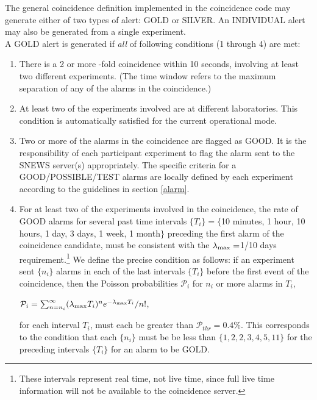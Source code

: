 \documentclass{article}
\begin{document}
The general coincidence definition implemented in the coincidence code
may generate either of two types of alert: GOLD or SILVER.
An INDIVIDUAL alert may also be generated from a single experiment.\\
A GOLD alert is generated if {\it all} of
following conditions (1 through 4) are met:

\begin{enumerate}

\item There is a 2 or more -fold coincidence within 10 seconds,
involving at least two different experiments. 
(The time window refers to the maximum
separation of any of the alarms in the coincidence.)

\item At least two of the experiments involved
are at different laboratories.  This condition is automatically
satisfied for the current operational mode.

\item Two or more of the alarms in the coincidence
are flagged as GOOD.  It is the responsibility of each participant
experiment to flag the alarm sent to the SNEWS server(s)
appropriately. The specific criteria for a GOOD/POSSIBLE/TEST alarms
are locally defined by each experiment according to the guidelines 
in section \ref{alarm}.
  
 \item For at least two of the experiments involved in the
 coincidence, the rate of GOOD alarms for several past time intervals
 $\{T_i\}=\{$10 minutes, 1 hour, 10 hours, 1 day, 3 days, 1 week, 1
 month$\}$ preceding the first alarm of the coincidence candidate, 
 must be consistent with the $\lambda_{\rm{max}}=$1/10 days
 requirement.\footnote{These intervals represent real time, not live
 time, since full live time information will not be available to the
 coincidence server.}  We define the precise condition as follows: if
 an experiment sent $\{n_i\}$ alarms in each of the last intervals
 $\{T_i\}$ before the first event of the coincidence, then the Poisson probabilities $\mathcal{P}_i$ for $n_i$
 or more alarms in $T_i$,

$\mathcal{P}_i=\sum_{n=n_i}^{\infty}(\lambda_{\rm{max}} T_i)^{n}e^{-\lambda_{\rm{max}} T_i}/n!$,

for each interval $T_i$, must each be greater than $\mathcal{P}_{thr}=0.4$\%.
This corresponds to the condition that each $\{n_i\}$ must be be less
than $\{1,2,2,3,4,5,11\}$ for the preceding intervals $\{T_i\}$ for an
alarm to be GOLD.

\end{enumerate}
\end{document}
